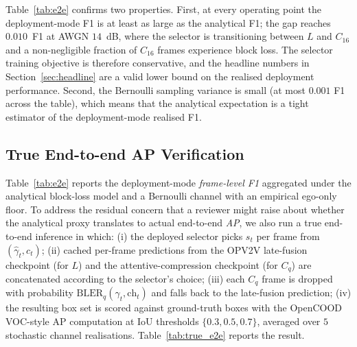 \documentclass[journal]{IEEEtran}
\begin{document}
Table~\ref{tab:e2e} confirms two properties. First, at every operating
point the deployment-mode F1 is at least as large as the analytical F1;
the gap reaches $0.010$~F1 at AWGN $14$~dB, where the selector is
transitioning between $L$ and $C_{16}$ and a non-negligible fraction of
$C_{16}$ frames experience block loss. The selector training objective is
therefore conservative, and the headline numbers in
Section~\ref{sec:headline} are a valid lower bound on the realised
deployment performance. Second, the Bernoulli sampling variance is small
(at most $0.001$ F1 across the table), which means that the analytical
expectation is a tight estimator of the deployment-mode realised F1.

\subsection{True End-to-end AP Verification}\label{sec:true_e2e}

Table~\ref{tab:e2e} reports the deployment-mode \emph{frame-level F1} aggregated under the analytical block-loss model and a Bernoulli channel with an empirical ego-only floor. To address the residual concern that a reviewer might raise about whether the analytical proxy translates to actual end-to-end \emph{AP}, we also run a true end-to-end inference in which: (i) the deployed selector picks $s_t$ per frame from $(\hat\gamma_t,c_t)$; (ii) cached per-frame predictions from the OPV2V late-fusion checkpoint (for $L$) and the attentive-compression checkpoint (for $C_q$) are concatenated according to the selector's choice; (iii) each $C_q$ frame is dropped with probability $\mathrm{BLER}_q(\gamma_t,\mathrm{ch}_t)$ and falls back to the late-fusion prediction; (iv) the resulting box set is scored against ground-truth boxes with the OpenCOOD VOC-style $\mathrm{AP}$ computation at IoU thresholds $\{0.3,0.5,0.7\}$, averaged over $5$ stochastic channel realisations. Table~\ref{tab:true_e2e} reports the result.
\end{document}

